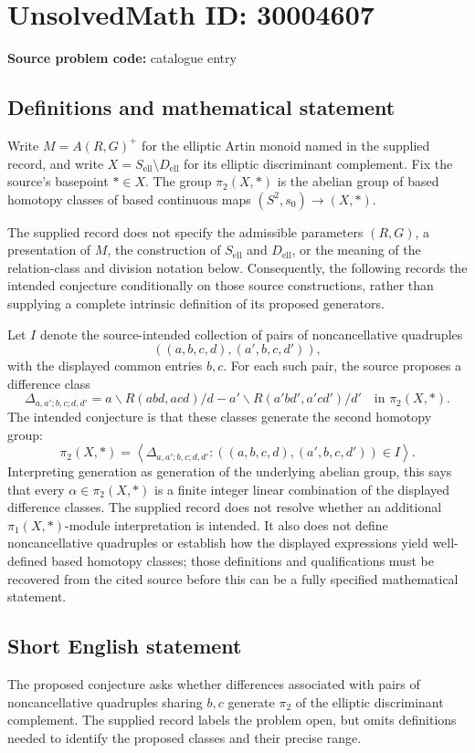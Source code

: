\documentclass[11pt]{article}
\begin{document}
\section*{UnsolvedMath ID: 30004607}
\textbf{Source problem code:} catalogue entry
\subsection{Definitions and mathematical statement}
Write \(M=A(R,G)^+\) for the elliptic Artin monoid named in the supplied record, and write \(X=S_{\mathrm{ell}}\setminus D_{\mathrm{ell}}\) for its elliptic discriminant complement. Fix the source's basepoint \(*\in X\). The group \(\pi_2(X,*)\) is the abelian group of based homotopy classes of based continuous maps \((S^2,s_0)\to(X,*)\).

The supplied record does not specify the admissible parameters \((R,G)\), a presentation of \(M\), the construction of \(S_{\mathrm{ell}}\) and \(D_{\mathrm{ell}}\), or the meaning of the relation-class and division notation below. Consequently, the following records the intended conjecture conditionally on those source constructions, rather than supplying a complete intrinsic definition of its proposed generators.

Let \(I\) denote the source-intended collection of pairs of noncancellative quadruples
\[
((a,b,c,d),(a',b,c,d')),
\]
with the displayed common entries \(b,c\). For each such pair, the source proposes a difference class
\[
\Delta_{a,a';b,c;d,d'}=
 a\backslash R(abd,acd)/d
 -a'\backslash R(a'bd',a'cd')/d'
 \quad\text{in }\pi_2(X,*).
\]
The intended conjecture is that these classes generate the second homotopy group:
\[
\pi_2(X,*)=
\left\langle
\Delta_{a,a';b,c;d,d'}:
((a,b,c,d),(a',b,c,d'))\in I
\right\rangle.
\]
Interpreting generation as generation of the underlying abelian group, this says that every \(\alpha\in\pi_2(X,*)\) is a finite integer linear combination of the displayed difference classes. The supplied record does not resolve whether an additional \(\pi_1(X,*)\)-module interpretation is intended. It also does not define noncancellative quadruples or establish how the displayed expressions yield well-defined based homotopy classes; those definitions and qualifications must be recovered from the cited source before this can be a fully specified mathematical statement.
\subsection{Short English statement}
The proposed conjecture asks whether differences associated with pairs of noncancellative quadruples sharing \(b,c\) generate \(\pi_2\) of the elliptic discriminant complement. The supplied record labels the problem open, but omits definitions needed to identify the proposed classes and their precise range.
\end{document}
